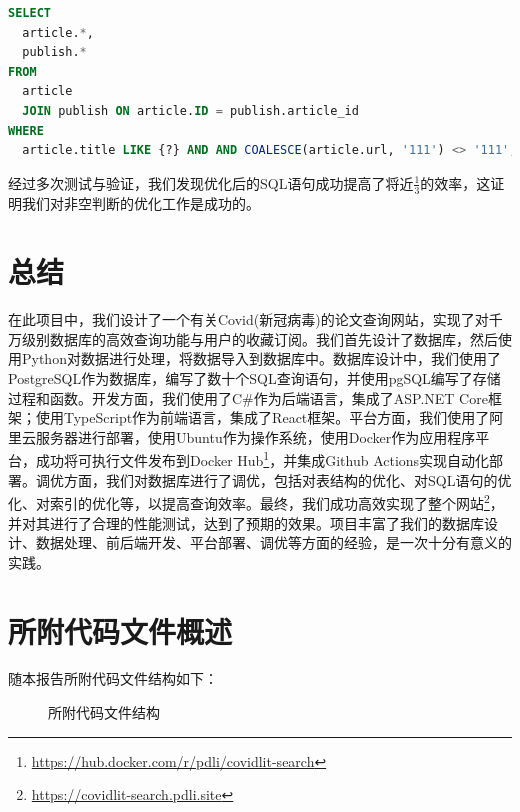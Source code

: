 \documentclass[UTF8,openany]{ctexbook}
\begin{document}
\begin{lstlisting}[language=sql]
SELECT
  article.*,
  publish.* 
FROM
  article
  JOIN publish ON article.ID = publish.article_id 
WHERE
  article.title LIKE {?} AND AND COALESCE(article.url, '111') <> '111';
\end{lstlisting}

经过多次测试与验证，我们发现优化后的SQL语句成功提高了将近$\frac{1}{3}$的效率，这证明我们对非空判断的优化工作是成功的。

\chapter{总结}
\label{sec:conclusion}

在此项目中，我们设计了一个有关Covid(新冠病毒)的论文查询网站，实现了对千万级别数据库的高效查询功能与用户的收藏订阅。我们首先设计了数据库，然后使用Python对数据进行处理，将数据导入到数据库中。数据库设计中，我们使用了PostgreSQL作为数据库，编写了数十个SQL查询语句，并使用pgSQL编写了存储过程和函数。开发方面，我们使用了C\#作为后端语言，集成了ASP.NET Core框架；使用TypeScript作为前端语言，集成了React框架。平台方面，我们使用了阿里云服务器进行部署，使用Ubuntu作为操作系统，使用Docker作为应用程序平台，成功将可执行文件发布到Docker Hub\footnote{\url{https://hub.docker.com/r/pdli/covidlit-search}}，并集成Github Actions实现自动化部署。调优方面，我们对数据库进行了调优，包括对表结构的优化、对SQL语句的优化、对索引的优化等，以提高查询效率。最终，我们成功高效实现了整个网站\footnote{\url{https://covidlit-search.pdli.site}}，并对其进行了合理的性能测试，达到了预期的效果。项目丰富了我们的数据库设计、数据处理、前后端开发、平台部署、调优等方面的经验，是一次十分有意义的实践。

\newpage

\appendix

\chapter{所附代码文件概述}
\label{appendix:code}

随本报告所附代码文件结构如下：

\begin{figure}[H]
  \caption{所附代码文件结构}
  \label{fig:processData}
\end{figure}
\end{document}
